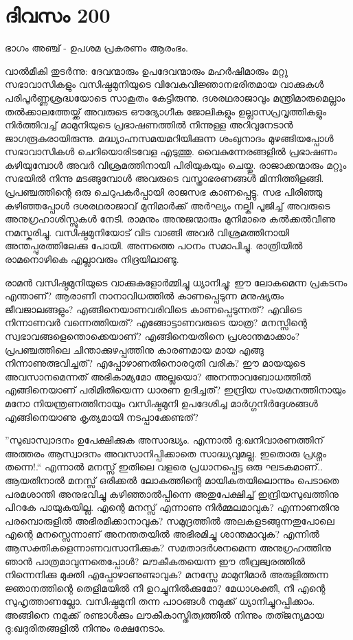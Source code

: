 \section{ദിവസം 200}

ഭാഗം അഞ്ച് - ഉപശമ പ്രകരണം ആരംഭം.


വാല്‍മീകി തുടർന്നു: ദേവന്മാരും ഉപദേവന്മാരും മഹർഷിമാരും മറ്റു സഭാവാസികളും വസിഷ്ഠമുനിയുടെ വിവേകവിജ്ഞാനഭരിതമായ വാക്കുകൾ പരിപൂർണ്ണശ്രദ്ധയോടെ സാകൂതം കേട്ടിരുന്നു. ദശരഥരാജാവും മന്ത്രിമാരുമെല്ലാം തൽക്കാലത്തേയ്ക്ക് അവരുടെ ഔദ്യോഗീക ജോലികളും ഉല്ലാസപ്രവൃത്തികളും നിർത്തിവച്ച് മാമുനിയുടെ പ്രഭാഷണത്തിൽ നിന്നുള്ള അറിവുനേടാൻ ജാഗരൂകരായിരുന്നു. മദ്ധ്യാഹ്നസമയമറിയിക്കുന്ന ശംഖുനാദം മുഴങ്ങിയപ്പോൾ സഭാവാസികൾ ചെറിയൊരിടവേള എടുത്തു. വൈകുന്നേരങ്ങളിൽ പ്രഭാഷണം കഴിയുമ്പോൾ അവർ വിശ്രമത്തിനായി പിരിയുകയും ചെയ്തു. രാജാക്കന്മാരും മറ്റും സഭയിൽ നിന്നു മടങ്ങുമ്പോൾ അവരുടെ വസ്ത്രാഭരണങ്ങൾ മിന്നിത്തിളങ്ങി. പ്രപഞ്ചത്തിന്റെ ഒരു ചെറുപകർപ്പായി രാജസഭ കാണപ്പെട്ടു. സഭ പിരിഞ്ഞു കഴിഞ്ഞപ്പോൾ ദശരഥരാജാവ് മുനിമാർക്ക് അർഘ്യം നല്കി പൂജിച്ച് അവരുടെ അനുഗ്രഹാശിസ്സുകൾ നേടി. രാമനും അനുജന്മാരും മുനിമാരെ കൽക്കൽവീണു നമസ്കരിച്ചു. വസിഷ്ഠമുനിയോട് വിട വാങ്ങി അവർ വിശ്രമത്തിനായി അന്തപ്പുരത്തിലേക്കു പോയി. അന്നത്തെ പഠനം സമാപിച്ചു. രാത്രിയിൽ രാമനൊഴികെ എല്ലാവരും നിദ്രയിലാണ്ടു.

രാമൻ വസിഷ്ഠമുനിയുടെ വാക്കുകളോർമ്മിച്ചു ധ്യാനിച്ചു: ഈ ലോകമെന്ന പ്രകടനം എന്താണ്‌? ആരാണീ നാനാവിധത്തിൽ കാണപ്പെടുന്ന മനുഷ്യരും ജീവജാലങ്ങളും? എങ്ങിനെയാണവരിവിടെ കാണപ്പെടുന്നത്? എവിടെ നിന്നാണവർ വന്നെത്തിയത്? എങ്ങോട്ടാണവരുടെ യാത്ര? മനസ്സിന്റെ സ്വഭാവങ്ങളെന്തൊക്കെയാണ്‌? എങ്ങിനെയതിനെ പ്രശാന്തമാക്കാം? പ്രപഞ്ചത്തിലെ ചിന്താക്കുഴപ്പത്തിനു കാരണമായ മായ എങ്ങു നിന്നാണുത്ഭവിച്ചത്? എപ്പോഴാണതിനൊരറുതി വരിക? ഈ മായയുടെ അവസാനമെന്നത് അഭികാമ്യമോ അല്ലയൊ? അനന്താവബോധത്തിൽ എങ്ങിനെയാണ്‌ പരിമിതിയെന്ന ധാരണ ഉദിച്ചത്? ഇന്ദ്രിയ സംയമനത്തിനായും മനോ നിയന്ത്രണത്തിനായും വസിഷ്ഠമുനി ഉപദേശിച്ച മാർഗ്ഗനിർദ്ദേശങ്ങൾ എങ്ങിനെയാണു കൃത്യമായി നടപ്പാക്കേണ്ടത്?

”സുഖാസ്വാദനം ഉപേക്ഷിക്കുക അസാദ്ധ്യം. എന്നാൽ ദു:ഖനിവാരണത്തിന്‌ അത്തരം ആസ്വാദനം അവസാനിപ്പിക്കാതെ സാദ്ധ്യവുമല്ല. ഇതൊരു പ്രശ്നം തന്നെ!.“ എന്നാൽ മനസ്സ് ഇതിലെ വളരെ പ്രധാനപ്പെട്ട ഒരു ഘടകമാണ്‌.. ആയതിനാൽ മനസ്സ് ഒരിക്കൽ ലോകത്തിന്റെ മായികതയിലൊന്നും പെടാതെ പരമശാന്തി അനുഭവിച്ചു കഴിഞ്ഞാൽപ്പിന്നെ അതുപേക്ഷിച്ച് ഇന്ദ്രിയസുഖത്തിനു പിറകേ പായുകയില്ല. എന്റെ മനസ്സ് എന്നാണു നിർമ്മലമാവുക? എന്നാണതിനു പരമ്പൊരുളിൽ അഭിരമിക്കാനാവുക? സമുദ്രത്തിൽ അലകളടങ്ങുന്നതുപോലെ എന്റെ മനസ്സെന്നാണ്‌ അനന്തതയിൽ അഭിരമിച്ചു ശാന്തമാവുക? എന്നിൽ ആസക്തികളെന്നാണവസാനിക്കുക? സമതാദർശനമെന്ന അനുഗ്രഹത്തിനു ഞാൻ പാത്രമാവുന്നതെപ്പോൾ? ലൗകീകതയെന്ന ഈ തീവ്രജ്വരത്തിൽ നിന്നെനിക്കു മുക്തി എപ്പോഴാണുണ്ടാവുക? മനസ്സേ മാമുനിമാർ അരുളിത്തന്ന ജ്ഞാനത്തിന്റെ തെളിമയിൽ നീ ഉറച്ചുനിൽക്കുമോ? മേധാശക്തീ, നീ എന്റെ സുഹൃത്താണല്ലോ. വസിഷ്ഠമുനി തന്ന പാഠങ്ങൾ നമുക്ക് ധ്യാനിച്ചുറപ്പിക്കാം.  അങ്ങിനെ നമുക്ക് രണ്ടാൾക്കും ലൗകീകാസ്തിത്വത്തിൽ നിന്നും തത്ജന്യമായ ദു:ഖദുരിതങ്ങളിൽ നിന്നും രക്ഷനേടാം. 
